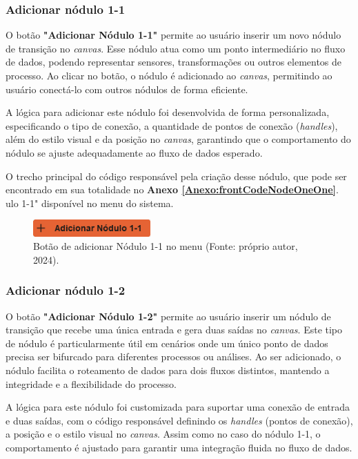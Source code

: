 \subsubsection{Adicionar nódulo 1-1}

O botão \textbf{"Adicionar Nódulo 1-1"} permite ao usuário inserir um novo nódulo de transição no \textit{canvas}. Esse nódulo atua como um ponto intermediário no fluxo de dados, podendo representar sensores, transformações ou outros elementos de processo. Ao clicar no botão, o nódulo é adicionado ao \textit{canvas}, permitindo ao usuário conectá-lo com outros nódulos de forma eficiente.

A lógica para adicionar este nódulo foi desenvolvida de forma personalizada, especificando o tipo de conexão, a quantidade de pontos de conexão (\textit{handles}), além do estilo visual e da posição no \textit{canvas}, garantindo que o comportamento do nódulo se ajuste adequadamente ao fluxo de dados esperado.

O trecho principal do código responsável pela criação desse nódulo, que pode ser encontrado em sua totalidade no \textbf{Anexo \ref{Anexo:frontCodeNodeOneOne}}.
ulo 1-1" disponível no menu do sistema.

\begin{figure}[htbp]
    \centering
    \includegraphics[width=0.4\textwidth]{figuras/add-node11-button.png}
    \caption{Botão de adicionar Nódulo 1-1 no menu (Fonte: próprio autor, 2024).}
    \label{Fig:AddNodeOneOneButton}
\end{figure}

\subsubsection{Adicionar nódulo 1-2}

O botão \textbf{"Adicionar Nódulo 1-2"} permite ao usuário inserir um nódulo de transição que recebe uma única entrada e gera duas saídas no \textit{canvas}. Este tipo de nódulo é particularmente útil em cenários onde um único ponto de dados precisa ser bifurcado para diferentes processos ou análises. Ao ser adicionado, o nódulo facilita o roteamento de dados para dois fluxos distintos, mantendo a integridade e a flexibilidade do processo.

A lógica para este nódulo foi customizada para suportar uma conexão de entrada e duas saídas, com o código responsável definindo os \textit{handles} (pontos de conexão), a posição e o estilo visual no \textit{canvas}. Assim como no caso do nódulo 1-1, o comportamento é ajustado para garantir uma integração fluida no fluxo de dados.

